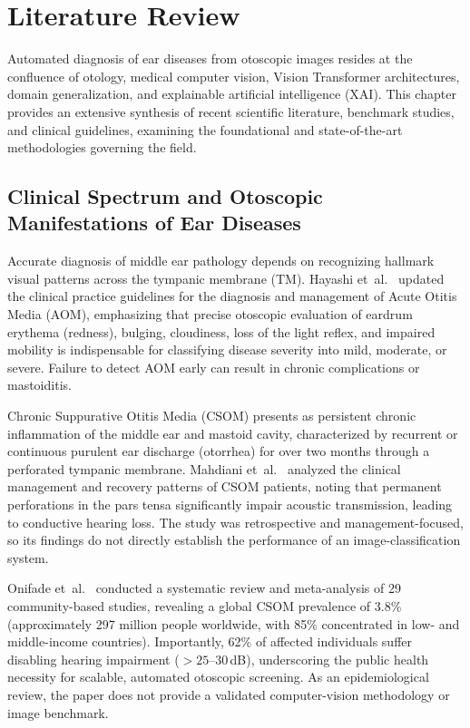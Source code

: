 \documentclass[12pt,a4paper]{report}
\begin{document}
\chapter{Literature Review}

Automated diagnosis of ear diseases from otoscopic images resides at the confluence of otology, medical computer vision, Vision Transformer architectures, domain generalization, and explainable artificial intelligence (XAI). This chapter provides an extensive synthesis of recent scientific literature, benchmark studies, and clinical guidelines, examining the foundational and state-of-the-art methodologies governing the field.

\section{Clinical Spectrum and Otoscopic Manifestations of Ear Diseases}
Accurate diagnosis of middle ear pathology depends on recognizing hallmark visual patterns across the tympanic membrane (TM). Hayashi et~al.~\cite{ref_hayashi2020_aom} updated the clinical practice guidelines for the diagnosis and management of Acute Otitis Media (AOM), emphasizing that precise otoscopic evaluation of eardrum erythema (redness), bulging, cloudiness, loss of the light reflex, and impaired mobility is indispensable for classifying disease severity into mild, moderate, or severe. Failure to detect AOM early can result in chronic complications or mastoiditis.

Chronic Suppurative Otitis Media (CSOM) presents as persistent chronic inflammation of the middle ear and mastoid cavity, characterized by recurrent or continuous purulent ear discharge (otorrhea) for over two months through a perforated tympanic membrane. Mahdiani et~al.~\cite{ref_mahdiani2021_csom} analyzed the clinical management and recovery patterns of CSOM patients, noting that permanent perforations in the pars tensa significantly impair acoustic transmission, leading to conductive hearing loss. The study was retrospective and management-focused, so its findings do not directly establish the performance of an image-classification system.

Onifade et~al.~\cite{ref_onifade2025_csom_prevalence} conducted a systematic review and meta-analysis of 29 community-based studies, revealing a global CSOM prevalence of 3.8\% (approximately 297 million people worldwide, with 85\% concentrated in low- and middle-income countries). Importantly, 62\% of affected individuals suffer disabling hearing impairment ($>25$--$30$\,dB), underscoring the public health necessity for scalable, automated otoscopic screening. As an epidemiological review, the paper does not provide a validated computer-vision methodology or image benchmark.
\end{document}
